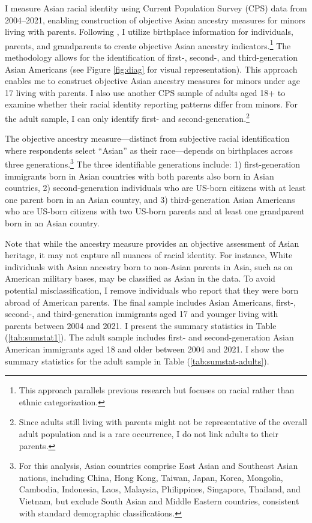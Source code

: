 I measure Asian racial identity using Current Population Survey (CPS) data from 2004--2021, enabling construction of objective Asian ancestry measures for minors living with parents. Following \textcite{antmanEthnicAttritionObserved2016,antmanEthnicAttritionAssimilation2020}, I utilize birthplace information for individuals, parents, and grandparents to create objective Asian ancestry indicators.\footnote{This approach parallels previous research but focuses on racial rather than ethnic categorization.} The methodology allows for the identification of first-, second-, and third-generation Asian Americans (see Figure \ref{fig:diag} for visual representation). This approach enables me to construct objective Asian ancestry measures for minors under age 17 living with parents. I also use another CPS sample of adults aged 18+ to examine whether their racial identity reporting patterns differ from minors. For the adult sample, I can only identify first- and second-generation.\footnote{Since adults still living with parents might not be representative of the overall adult population and is a rare occurrence, I do not link adults to their parents.}

The objective ancestry measure---distinct from subjective racial identification where respondents select ``Asian'' as their race---depends on birthplaces across three generations.\footnote{For this analysis, Asian countries comprise East Asian and Southeast Asian nations, including China, Hong Kong, Taiwan, Japan, Korea, Mongolia, Cambodia, Indonesia, Laos, Malaysia, Philippines, Singapore, Thailand, and Vietnam, but exclude South Asian and Middle Eastern countries, consistent with standard demographic classifications.} The three identifiable generations include: 1) first-generation immigrants born in Asian countries with both parents also born in Asian countries, 2) second-generation individuals who are US-born citizens with at least one parent born in an Asian country, and 3) third-generation Asian Americans who are US-born citizens with two US-born parents and at least one grandparent born in an Asian country. 

Note that while the ancestry measure provides an objective assessment of Asian heritage, it may not capture all nuances of racial identity. For instance, White individuals with Asian ancestry born to non-Asian parents in Asia, such as on American military bases, may be classified as Asian in the data. To avoid potential misclassification, I remove individuals who report that they were born abroad of American parents. The final sample includes Asian Americans, first-, second-, and third-generation immigrants aged 17 and younger living with parents between 2004 and 2021. I present the summary statistics in Table (\ref{tab:sumstat1}). The adult sample includes first- and second-generation Asian American immigrants aged 18 and older between 2004 and 2021. I show the summary statistics for the adult sample in Table (\ref{tab:sumstat-adults}).

